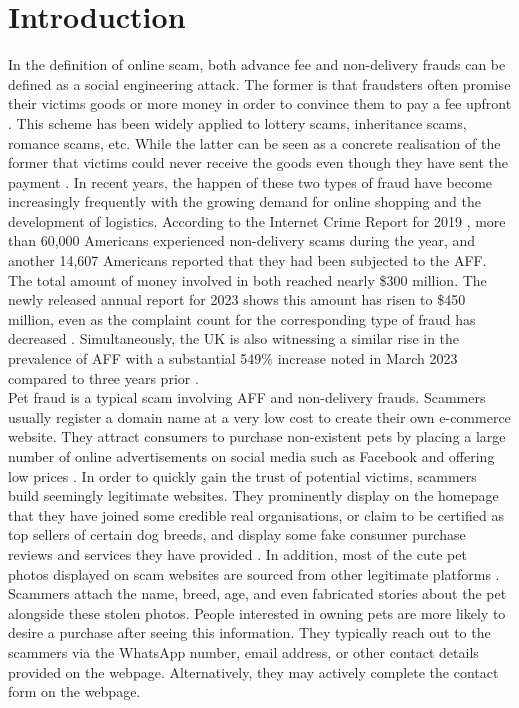 \documentclass[ oneside,%
                    author={Cassie Qing Tang},
                    degree={BSc},
                     title={An Automated Response System for Disrupting Online Pet Scamming \\ },
                    subtitle={ }]{dissertation}
\begin{document}
\chapter{Introduction}
\label{chap:context}
In the definition of online scam, both advance fee and non-delivery frauds can be defined as a social engineering attack. The former is that fraudsters often promise their victims goods or more money in order to convince them to pay a fee upfront \cite{claude_toward_2014}. This scheme has been widely applied to lottery scams, inheritance scams, romance scams, etc. While the latter can be seen as a concrete realisation of the former that victims could never receive the goods even though they have sent the payment \cite{whittaker_understanding_2020}. In recent years, the happen of these two types of fraud have become increasingly frequently with the growing demand for online shopping and the development of logistics. According to the Internet Crime Report for 2019 \cite{noauthor_2019_nodate}, more than 60,000 Americans experienced non-delivery scams during the year, and another 14,607 Americans reported that they had been subjected to the AFF. The total amount of money involved in both reached nearly \$300 million. The newly released annual report for 2023 shows this amount has risen to \$450 million, even as the complaint count for the corresponding type of fraud has decreased \cite{noauthor_2023_nodate}. Simultaneously, the UK is also witnessing a similar rise in the prevalence of AFF with a substantial 549\% increase noted in March 2023 compared to three years prior \cite{stripe_crime_2023}. 
\\

Pet fraud is a typical scam involving AFF and non-delivery frauds. Scammers usually register a domain name at a very low cost to create their own e-commerce website. They attract consumers to purchase non-existent pets by placing a large number of online advertisements on social media such as Facebook and offering low prices \cite{price_resource_2020}. In order to quickly gain the trust of potential victims, scammers build seemingly legitimate websites. They prominently display on the homepage that they have joined some credible real organisations, or claim to be certified as top sellers of certain dog breeds, and display some fake consumer purchase reviews and services they have provided \cite{price_resource_2020}. In addition, most of the cute pet photos displayed on scam websites are sourced from other legitimate platforms \cite{better_business_bureau_bbb_2017}. Scammers attach the name, breed, age, and even fabricated stories about the pet alongside these stolen photos. People interested in owning pets are more likely to desire a purchase after seeing this information. They typically reach out to the scammers via the WhatsApp number, email address, or other contact details provided on the webpage. Alternatively, they may actively complete the contact form on the webpage.
\\
\end{document}
